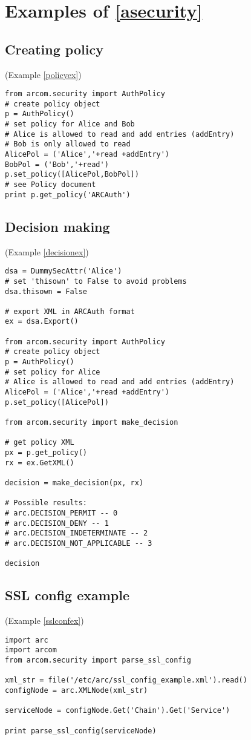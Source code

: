 \section{Examples of \ref{asecurity}}
\subsection{Creating policy}
(Example \ref{policyex})
\label{cpolicyex}
\begin{verbatim}
from arcom.security import AuthPolicy
# create policy object
p = AuthPolicy()
# set policy for Alice and Bob
# Alice is allowed to read and add entries (addEntry)
# Bob is only allowed to read
AlicePol = ('Alice','+read +addEntry')
BobPol = ('Bob','+read')
p.set_policy([AlicePol,BobPol])
# see Policy document
print p.get_policy('ARCAuth')
\end{verbatim}

\subsection{Decision making}
(Example \ref{decisionex})
\label{cdecisionex}
\begin{verbatim}
dsa = DummySecAttr('Alice')
# set 'thisown' to False to avoid problems
dsa.thisown = False

# export XML in ARCAuth format
ex = dsa.Export()

from arcom.security import AuthPolicy
# create policy object
p = AuthPolicy()
# set policy for Alice
# Alice is allowed to read and add entries (addEntry)
AlicePol = ('Alice','+read +addEntry')
p.set_policy([AlicePol])

from arcom.security import make_decision

# get policy XML
px = p.get_policy()
rx = ex.GetXML()

decision = make_decision(px, rx)

# Possible results:
# arc.DECISION_PERMIT -- 0
# arc.DECISION_DENY -- 1
# arc.DECISION_INDETERMINATE -- 2
# arc.DECISION_NOT_APPLICABLE -- 3

decision
\end{verbatim}

\subsection{SSL config example}
(Example \ref{sslconfex})
\label{csslconfex}
\begin{verbatim}
import arc
import arcom
from arcom.security import parse_ssl_config

xml_str = file('/etc/arc/ssl_config_example.xml').read()
configNode = arc.XMLNode(xml_str)

serviceNode = configNode.Get('Chain').Get('Service')

print parse_ssl_config(serviceNode)
\end{verbatim}

